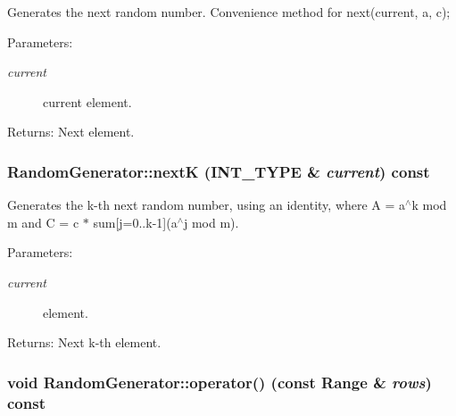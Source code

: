 Generates the next random number. Convenience method for next(current, a, c); \begin{Desc}
\item[Parameters:]
\begin{description}
\item[{\em current}]current element. \end{description}
\end{Desc}
\begin{Desc}
\item[Returns:]Next element. \end{Desc}
\hypertarget{class_random_generator_d0ee441c774a78abd93a50c0b08eea43}{
\subsubsection[{nextK}]{ RandomGenerator::nextK ({\bf INT\_\-TYPE} \& {\em current}) const}}
\label{class_random_generator_d0ee441c774a78abd93a50c0b08eea43}


Generates the k-th next random number, using an identity, where A = a$^\wedge$k mod m and C = c $\ast$ sum\mbox{[}j=0..k-1\mbox{]}(a$^\wedge$j mod m). \begin{Desc}
\item[Parameters:]
\begin{description}
\item[{\em current}]element. \end{description}
\end{Desc}
\begin{Desc}
\item[Returns:]Next k-th element. \end{Desc}
\hypertarget{class_random_generator_bfa47006c53f82e85cbc77ae5e667747}{
\subsubsection[{operator()}]{\setlength{\rightskip}{0pt plus 5cm}void RandomGenerator::operator() (const {\bf Range} \& {\em rows}) const}}
\label{class_random_generator_bfa47006c53f82e85cbc77ae5e667747}



